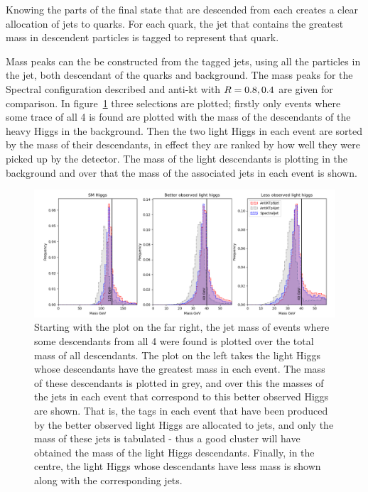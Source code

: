 Knowing the parts of the final state that are descended from each  creates a clear
allocation of jets to quarks.
For each quark, the jet that contains the greatest mass in descendent particles is tagged to represent that quark.

Mass peaks can the be constructed from the tagged jets, using all the particles in the jet,
both descendant of the quarks and background.
The mass peaks for the Spectral configuration described and anti-kt 
with \(R{} = 0.8, 0.4\) are given for comparison.
In figure~\ref{fig:best_correct_h_allocation} three selections are plotted; firstly only events where some trace of all 4  is found
are plotted with the mass of the descendants of the heavy Higgs in the background.
Then the two light Higgs in each event are sorted by the mass of their descendants,
in effect they are ranked by how well they were picked up by the detector.
The mass of the light descendants is plotting in the background and over
that the mass of the associated jets in each event is shown.




\begin{figure}[htp]
    \includegraphics[width=1.\textwidth]{graphics/mass_peaks/light_long_correct_frequency.png}
    \caption{Starting with the plot on the far right, the jet mass of events where
        some descendants from all 4  were found is plotted over
        the total mass of all descendants.
        The plot on the left takes the light Higgs whose descendants have the greatest mass in each event.
        The mass of these descendants is plotted in grey, and over this
        the masses of the jets in each event that correspond to this better observed Higgs
        are shown.
        That is, the tags in each event that have been produced by the better observed light Higgs
        are allocated to jets, and only the mass of these jets is tabulated - thus
        a good cluster will have obtained the mass of the light Higgs descendants.
        Finally, in the centre, the light Higgs whose descendants have less mass is shown along with
        the corresponding jets.
    }\label{fig:best_correct_h_allocation}
\end{figure}    



